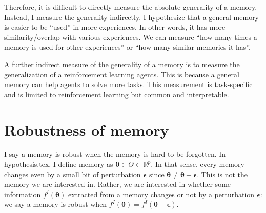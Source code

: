 \documentclass[12pt]{article}
\begin{document}
Therefore, it is difficult to directly measure the absolute generality of a memory. Instead, I measure the 
generality indirectly. I hypothesize that a general memory is easier to be ``used'' in more experiences. In other 
words, it has more similarity/overlap with various experiences. We can measure ``how many times a memory is used for other experiences'' 
or ``how many similar memories it has''.

A further indirect measure of the generality of a memory is to measure the generalization of a reinforcement learning agents. 
This is because a general memory can help agents to solve more tasks. This measurement is task-specific and is limited to 
reinforcement learning but common and interpretable.

\section{Robustness of memory}
I say a memory is robust when the memory is hard to be forgotten. In hypothesis.tex, I define memory as 
$\bm{\theta} \in \Theta \subset \mathbb{R}^p$. In that sense, every memory changes even by a small bit of 
perturbation $\bm{\epsilon}$ since $\bm{\theta} \neq \bm{\theta} + \bm{\epsilon}$. This is not the memory 
we are interested in. Rather, we are interested in whether some information $f^I(\bm{\theta})$ extracted from a memory changes or not 
by a perturbation $\bm{\epsilon}$: we say a memory is robust when $f^I(\bm{\theta}) = f^I(\bm{\theta}+ \bm{\epsilon})$.
\end{document}
